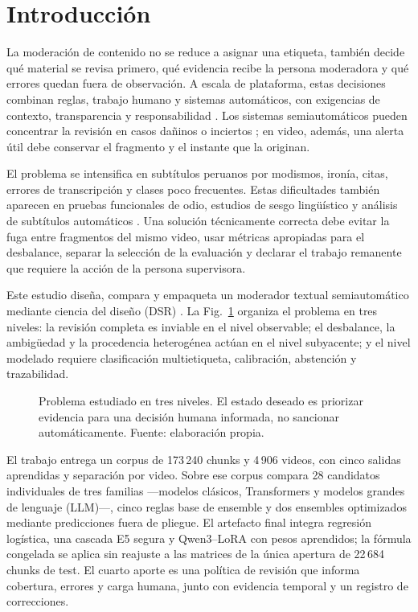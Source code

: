 \section{Introducción}

La moderación de contenido no se reduce a asignar una etiqueta, también decide qué material se revisa primero, qué evidencia recibe la persona moderadora y qué errores quedan fuera de observación. A escala de plataforma, estas decisiones combinan reglas, trabajo humano y sistemas automáticos, con exigencias de contexto, transparencia y responsabilidad \cite{gorwa2020moderation}. Los sistemas semiautomáticos pueden concentrar la revisión en casos dañinos o inciertos \cite{andersen2021rem}; en video, además, una alerta útil debe conservar el fragmento y el instante que la originan.

El problema se intensifica en subtítulos peruanos por modismos, ironía, citas, errores de transcripción y clases poco frecuentes. Estas dificultades también aparecen en pruebas funcionales de odio, estudios de sesgo lingüístico y análisis de subtítulos automáticos \cite{rottger2021hatecheck,sap2019racialbias,tatman2017captions}. Una solución técnicamente correcta debe evitar la fuga entre fragmentos del mismo video, usar métricas apropiadas para el desbalance, separar la selección de la evaluación y declarar el trabajo remanente que requiere la acción de la persona supervisora.

Este estudio diseña, compara y empaqueta un moderador textual semiautomático mediante ciencia del diseño (DSR) \cite{hevner2004dsr,peffers2007dsrm}. La Fig.~\ref{fig:brechas} organiza el problema en tres niveles: la revisión completa es inviable en el nivel observable; el desbalance, la ambigüedad y la procedencia heterogénea actúan en el nivel subyacente; y el nivel modelado requiere clasificación multietiqueta, calibración, abstención y trazabilidad.

\begin{figure}[t]
\centering
\resizebox{\textwidth}{!}{}
\caption{Problema estudiado en tres niveles. El estado deseado es priorizar evidencia para una decisión humana informada, no sancionar automáticamente. Fuente: elaboración propia.}
\label{fig:brechas}
\end{figure}

El trabajo entrega un corpus de 173\,240 chunks y 4\,906 videos, con cinco salidas aprendidas y separación por video. Sobre ese corpus compara 28 candidatos individuales de tres familias ---modelos clásicos, Transformers y modelos grandes de lenguaje (LLM)---, cinco reglas base de ensemble y dos ensembles optimizados mediante predicciones fuera de pliegue. El artefacto final integra regresión logística, una cascada E5 segura y Qwen3--LoRA con pesos aprendidos; la fórmula congelada se aplica sin reajuste a las matrices de la única apertura de 22\,684 chunks de test. El cuarto aporte es una política de revisión que informa cobertura, errores y carga humana, junto con evidencia temporal y un registro de correcciones.
